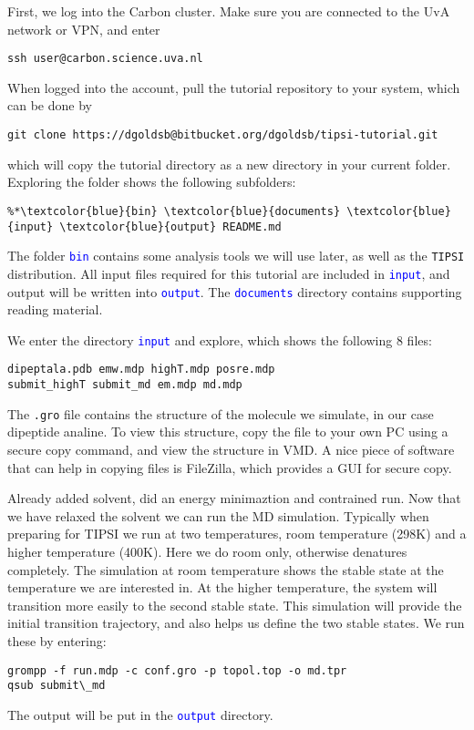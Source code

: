 \documentclass[]{article}
\begin{document}
First, we log into the Carbon cluster. Make sure you are connected to the UvA network or VPN, and enter
%
\begin{lstlisting}
ssh user@carbon.science.uva.nl
\end{lstlisting}
%
When logged into the account, pull the tutorial repository to your system, which can be done by
%
\begin{lstlisting}
git clone https://dgoldsb@bitbucket.org/dgoldsb/tipsi-tutorial.git
\end{lstlisting}
%
which will copy the tutorial directory as a new directory in your current folder. Exploring the folder shows the following subfolders:
%
\begin{lstlisting}
%*\textcolor{blue}{bin} \textcolor{blue}{documents} \textcolor{blue}{input} \textcolor{blue}{output} README.md
\end{lstlisting}
%
The folder \texttt{\textcolor{blue}{bin}} contains some analysis tools we will use later, as well as the \texttt{TIPSI} distribution. All input files required for this tutorial are included in \texttt{\textcolor{blue}{input}}, and output will be written into \texttt{\textcolor{blue}{output}}. The \texttt{\textcolor{blue}{documents}} directory contains supporting reading material.

We enter the directory \texttt{\textcolor{blue}{input}} and explore, which shows the following 8 files:
%
\begin{lstlisting}
dipeptala.pdb emw.mdp highT.mdp posre.mdp 
submit_highT submit_md em.mdp md.mdp
\end{lstlisting}
%
The \texttt{.gro} file contains the structure of the molecule we simulate, in our case dipeptide analine. To view this structure, copy the file to your own PC using a secure copy command, and view the structure in VMD. A nice piece of software that can help in copying files is FileZilla, which provides a GUI for secure copy.

Already added solvent, did an energy minimaztion and contrained run. Now that we have relaxed the solvent we can run the MD simulation. Typically when preparing for \textsc{TIPSI} we run at two temperatures, room temperature (298K) and a higher temperature (400K). Here we do room only, otherwise denatures completely. The simulation at room temperature shows the stable state at the temperature we are interested in. At the higher temperature, the system will transition more easily to the second stable state. This simulation will provide the initial transition trajectory, and also helps us define the two stable states. We run these by entering:
%
\begin{lstlisting}
grompp -f run.mdp -c conf.gro -p topol.top -o md.tpr
qsub submit\_md
\end{lstlisting}
%
The output will be put in the \texttt{\textcolor{blue}{output}} directory.
\end{document}
